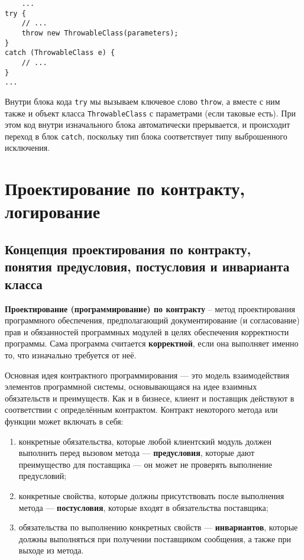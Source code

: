 \begin{lstlisting}
    ...
try {
    // ...
    throw new ThrowableClass(parameters);
}
catch (ThrowableClass e) {
    // ...
}
...
\end{lstlisting}

Внутри блока кода \verb|try| мы вызываем ключевое слово \verb|throw|, а вместе с ним также и объект класса \verb|ThrowableClass| с параметрами (если таковые есть). При этом код внутри изначального блока автоматически прерывается, и происходит переход в блок \verb|catch|, поскольку тип блока соответствует типу выброшенного исключения.

\chapter{Проектирование по контракту, логирование}

\section{Концепция проектирования по контракту, понятия предусловия, постусловия и инварианта класса}

\textbf{Проектирование (программирование) по контракту} –  метод проектирования программного обеспечения, предполагающий документирование (и согласование) прав и обязанностей программных модулей в целях обеспечения корректности программы. Сама программа считается \textbf{корректной}, если она выполняет именно то, что изначально требуется от неё.

Основная идея контрактного программирования — это модель взаимодействия элементов программной системы, основывающаяся на идее взаимных обязательств и преимуществ. Как и в бизнесе, клиент и поставщик действуют в соответствии с определённым контрактом. Контракт некоторого метода или функции может включать в себя:

\begin{enumerate}
    \item конкретные обязательства, которые любой клиентский модуль должен выполнить перед вызовом метода — \textbf{предусловия}, которые дают преимущество для поставщика — он может не проверять выполнение предусловий;
    \item конкретные свойства, которые должны присутствовать после выполнения метода — \textbf{постусловия}, которые входят в обязательства поставщика;
    \item обязательства по выполнению конкретных свойств — \textbf{инвариантов}, которые должны выполняться при получении поставщиком сообщения, а также при выходе из метода.
\end{enumerate}

